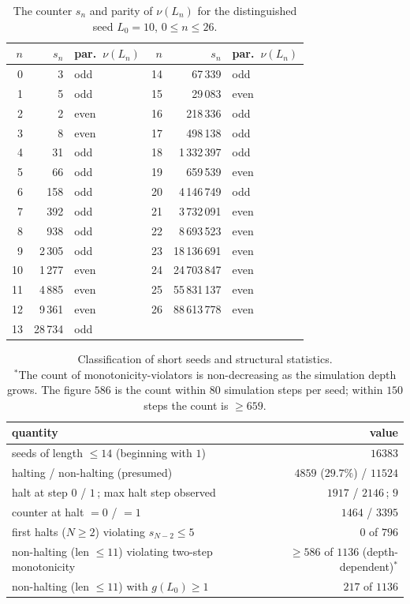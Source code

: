 \documentclass[a4paper]{article}
\theoremstyle{plain}
\theoremstyle{definition}
\theoremstyle{remark}
\begin{document}
\begin{table}[H]\centering
\begin{tabular}{rrl|rrl}
$n$ & $s_n$ & par.\ $\nu(L_n)$ & $n$ & $s_n$ & par.\ $\nu(L_n)$\\
\hline
0 & 3 & odd & 14 & 67\,339 & odd\\
1 & 5 & odd & 15 & 29\,083 & even\\
2 & 2 & even & 16 & 218\,336 & odd\\
3 & 8 & even & 17 & 498\,138 & odd\\
4 & 31 & odd & 18 & 1\,332\,397 & odd\\
5 & 66 & odd & 19 & 659\,539 & even\\
6 & 158 & odd & 20 & 4\,146\,749 & odd\\
7 & 392 & odd & 21 & 3\,732\,091 & even\\
8 & 938 & odd & 22 & 8\,693\,523 & even\\
9 & 2\,305 & odd & 23 & 18\,136\,691 & even\\
10 & 1\,277 & even & 24 & 24\,703\,847 & even\\
11 & 4\,885 & even & 25 & 55\,831\,137 & even\\
12 & 9\,361 & even & 26 & 88\,613\,778 & even\\
13 & 28\,734 & odd & & &
\end{tabular}
\caption{The counter $s_n$ and parity of $\nu(L_n)$ for the distinguished seed $L_0=10$, $0\le n\le 26$.}
\label{b2:tab:traj}
\end{table}

\begin{table}[H]\centering
\begin{tabular}{lr}
quantity & value\\
\hline
seeds of length $\le 14$ (beginning with $1$) & $16383$\\
halting / non-halting (presumed) & $4859$ ($29.7\%$) / $11524$\\
halt at step $0$ / $1$\,; max halt step observed & $1917$ / $2146$\,; $9$\\
counter at halt $=0$ / $=1$ & $1464$ / $3395$\\
first halts ($N\ge 2$) violating $s_{N-2}\le 5$ & $0$ of $796$\\
non-halting (len $\le 11$) violating two-step monotonicity & $\ge 586$ of $1136$ (depth-dependent)$^*$\\
non-halting (len $\le 11$) with $g(L_0)\ge 1$ & $217$ of $1136$\\
\end{tabular}
\caption{Classification of short seeds and structural statistics.\\
$^*${\small The count of monotonicity-violators is non-decreasing as the simulation depth grows. The figure $586$ is the count within $80$ simulation steps per seed; within $150$ steps the count is $\ge 659$.}}
\label{b2:tab:stats}
\end{table}
\end{document}
